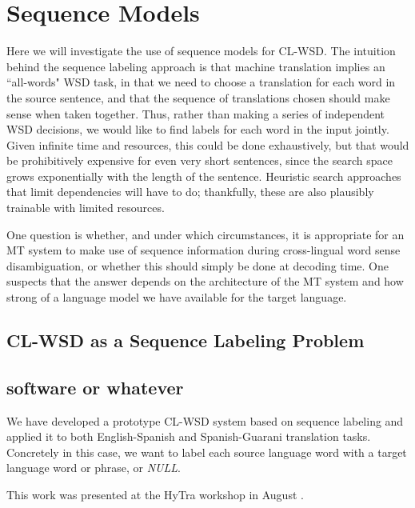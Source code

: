 \chapter{Sequence Models}
\label{chap:sequence}

Here we will investigate the use of sequence models for CL-WSD. The intuition
behind the sequence labeling approach is that machine translation implies an
``all-words" WSD task, in that we need to choose a translation for each word in
the source sentence, and that the sequence of translations chosen should make
sense when taken together. Thus, rather than making a series of independent WSD
decisions, we would like to find labels for each word in the input jointly.
Given infinite time and resources, this could be done exhaustively, but that
would be prohibitively expensive for even very short sentences, since the
search space grows exponentially with the length of the sentence.  Heuristic
search approaches that limit dependencies will have to do; thankfully, these
are also plausibly trainable with limited resources.

One question is whether, and under which circumstances, it is appropriate
for an MT system to make use of sequence information during cross-lingual word
sense disambiguation, or whether this should simply be done at decoding time.
One suspects that the answer depends on the architecture of the MT system and
how strong of a language model we have available for the target language.

\section{CL-WSD as a Sequence Labeling Problem}


\section{software or whatever}
We have developed a prototype CL-WSD system based on sequence labeling and
applied it to both English-Spanish and Spanish-Guarani translation tasks.
Concretely in this case, we want to label each source language word with a
target language word or phrase, or \emph{NULL}.

This work was presented at the HyTra workshop in August
\cite{rudnick-gasser:2013:HyTra}.

